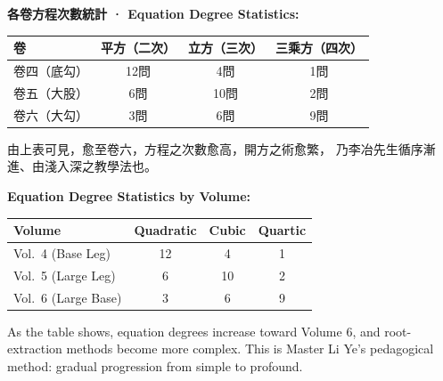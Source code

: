 \documentclass[9pt,a4paper]{article}
\begin{document}
\noindent\begin{minipage}[t]{0.48\textwidth}
\noindent\textbf{各卷方程次數統計 · Equation Degree Statistics:}

\begin{center}
\begin{tabular}{lccc}
\toprule
\textbf{卷} & \textbf{平方（二次）} & \textbf{立方（三次）} & \textbf{三乘方（四次）} \\
\midrule
卷四（底勾） & 12問 & 4問 & 1問 \\
卷五（大股） & 6問 & 10問 & 2問 \\
卷六（大勾） & 3問 & 6問 & 9問 \\
\bottomrule
\end{tabular}
\end{center}

由上表可見，愈至卷六，方程之次數愈高，開方之術愈繁，
乃李冶先生循序漸進、由淺入深之教學法也。
\end{minipage}%
\hfill%
\begin{minipage}[t]{0.50\textwidth}
\noindent\textbf{Equation Degree Statistics by Volume:}

\begin{center}
\begin{tabular}{lccc}
\toprule
\textbf{Volume} & \textbf{Quadratic} & \textbf{Cubic} & \textbf{Quartic} \\
\midrule
Vol.\ 4 (Base Leg) & 12 & 4 & 1 \\
Vol.\ 5 (Large Leg) & 6 & 10 & 2 \\
Vol.\ 6 (Large Base) & 3 & 6 & 9 \\
\bottomrule
\end{tabular}
\end{center}

As the table shows, equation degrees increase toward Volume 6, and root-
extraction methods become more complex. This is Master Li Ye's pedagogical
method: gradual progression from simple to profound.
\end{minipage}
\vspace{0.15cm}
\end{document}
